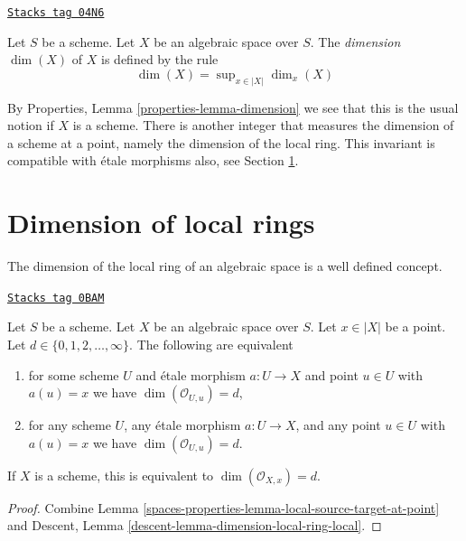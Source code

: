 \begin{definition}[Dimension]
\label{spaces-properties-definition-dimension}
\href{https://stacks.math.columbia.edu/tag/04N6}{\texttt{Stacks tag 04N6}}

Let $S$ be a scheme. Let $X$ be an algebraic space over $S$.
The {\it dimension} $\dim(X)$ of $X$ is defined by the rule
$$
\dim(X) = \sup\nolimits_{x \in |X|} \dim_x(X)
$$
\end{definition}

By
Properties, Lemma \ref{properties-lemma-dimension}
we see that this is the usual notion if $X$ is a scheme.
There is another integer that measures the dimension of a scheme
at a point, namely the dimension of the local ring. This invariant
is compatible with \'etale morphisms also, see
Section \ref{spaces-properties-section-dimension-local-ring}.

\section{Dimension of local rings}
\label{spaces-properties-section-dimension-local-ring}
The dimension of the local ring of an algebraic space is a well defined
concept.

\begin{lemma}
\label{spaces-properties-lemma-pre-dimension-local-ring}
\href{https://stacks.math.columbia.edu/tag/0BAM}{\texttt{Stacks tag 0BAM}}

Let $S$ be a scheme.
Let $X$ be an algebraic space over $S$.
Let $x \in |X|$ be a point.
Let $d \in \{0, 1, 2, \ldots, \infty\}$.
The following are equivalent
\begin{enumerate}
\item for some scheme $U$ and \'etale morphism $a : U \to X$ and point
$u \in U$ with $a(u) = x$ we have $\dim(\mathcal{O}_{U, u}) = d$,
\item for any scheme $U$, any \'etale morphism $a : U \to X$, and any point
$u \in U$ with $a(u) = x$ we have $\dim(\mathcal{O}_{U, u}) = d$.
\end{enumerate}
If $X$ is a scheme, this is equivalent to $\dim(\mathcal{O}_{X, x}) = d$.
\end{lemma}

\begin{proof}
Combine
Lemma \ref{spaces-properties-lemma-local-source-target-at-point} and
Descent, Lemma \ref{descent-lemma-dimension-local-ring-local}.
\end{proof}

